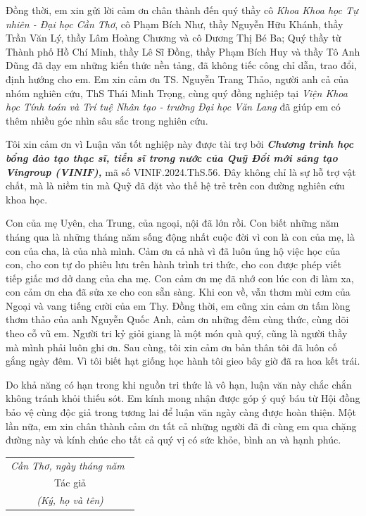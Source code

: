 Đồng thời, em xin gửi lời cảm ơn chân thành đến quý thầy cô \textit{Khoa Khoa học Tự nhiên - Đại học Cần Thơ}, cô Phạm Bích Như, thầy Nguyễn Hữu Khánh, thầy Trần Văn Lý, thầy Lâm Hoàng Chương và cô Dương Thị Bé Ba; Quý thầy từ Thành phố Hồ Chí Minh, thầy Lê Sĩ Đồng, thầy Phạm Bích Huy và thầy Tô Anh Dũng đã dạy em những kiến thức nền tảng, đã không tiếc công chỉ dẫn, trao đổi, định hướng cho em. Em xin cảm ơn TS. Nguyễn Trang Thảo, người anh cả của nhóm nghiên cứu, ThS Thái Minh Trọng, cùng quý đồng nghiệp tại \textit{Viện Khoa học Tính toán và Trí tuệ Nhân tạo - trường Đại học Văn Lang} đã giúp em có thêm nhiều góc nhìn sâu sắc trong nghiên cứu.

Tôi xin cảm ơn vì Luận văn tốt nghiệp này được tài trợ bởi \textbf{\textit{Chương trình học bổng đào tạo thạc sĩ, tiến sĩ trong nước của Quỹ Đổi mới sáng tạo Vingroup (VINIF),}} mã số VINIF.2024.ThS.56. Đây không chỉ là sự hỗ trợ vật chất, mà là niềm tin mà Quỹ đã đặt vào thế hệ trẻ trên con đường nghiên cứu khoa học.

Con của mẹ Uyên, cha Trung, của ngoại, nội đã lớn rồi. Con biết những năm tháng qua là những tháng năm sống động nhất cuộc đời vì con là con của mẹ, là con của cha, là của nhà mình. Cảm ơn cả nhà vì đã luôn ủng hộ việc học của con, cho con tự do phiêu lưu trên hành trình tri thức, cho con được phép viết tiếp giấc mơ dở dang của cha mẹ. Con cảm ơn mẹ đã nhớ con lúc con đi làm xa, con cảm ơn cha đã sửa xe cho con sẵn sàng. Khi con về, vẫn thơm mùi cơm của Ngoại và vang tiếng cười của em Thy. Đồng thời, em cũng xin cảm ơn tấm lòng thơm thảo của anh Nguyễn Quốc Anh, cảm ơn những đêm cùng thức, cùng dõi theo cỗ vũ em. Người tri kỷ giỏi giang là một món quà quý, cũng là người thầy mà mình phải luôn ghi ơn. Sau cùng, tôi xin cảm ơn bản thân tôi đã luôn cố gắng ngày đêm. Vì tôi biết hạt giống học hành tôi gieo bây giờ đã ra hoa kết trái.
 
Do khả năng có hạn trong khi nguồn tri thức là vô hạn, luận văn này chắc chắn không tránh khỏi thiếu sót. Em kính mong nhận được góp ý quý báu từ Hội đồng bảo vệ cùng độc giả trong tương lai để luận văn ngày càng được hoàn thiện. Một lần nữa, em xin chân thành cảm ơn tất cả những người đã đi cùng em qua chặng đường này và kính chúc cho tất cả quý vị có sức khỏe, bình an và hạnh phúc.



\hspace*{\fill}
\begin{tabular}{@{}c@{}} 
	\\\it 
	Cần Thơ, ngày \quad tháng \quad năm \qquad\,\\
	Tác giả\\
	\textit{(Ký, họ và tên)}
	
\end{tabular}

